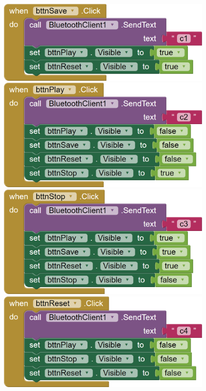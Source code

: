 \documentclass[11pt,titlepage,a4paper]{article}
\begin{document}
\begin{center}
    \includegraphics[width=0.8\textwidth]{img/app_src/commands/Save.png}
    \includegraphics[width=0.8\textwidth]{img/app_src/commands/Play.png}
    \includegraphics[width=0.8\textwidth]{img/app_src/commands/Stop.png}
    \includegraphics[width=0.8\textwidth]{img/app_src/commands/Reset.png}
\end{center}
\end{document}
